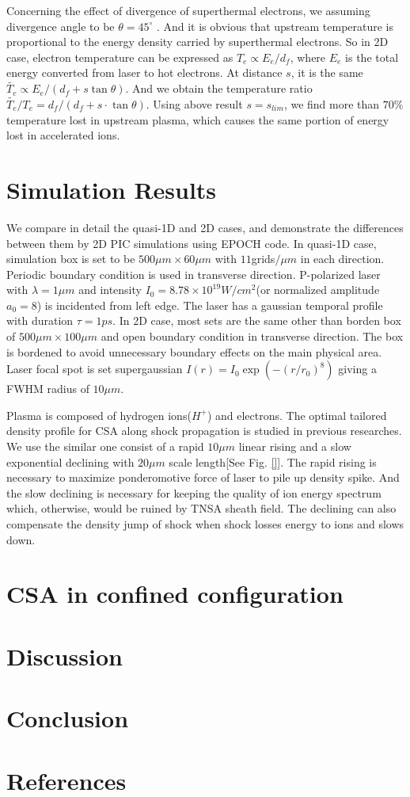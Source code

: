 \documentclass[12pt]{iopart}
\begin{document}
Concerning the effect of divergence of superthermal electrons, we assuming divergence angle to be $\theta=45^\circ$  \cite{gibbon_short_2005}. And it is obvious that upstream temperature is proportional to the energy density carried by superthermal electrons. So in 2D case, electron temperature can be expressed as $T_e\propto E_e/d_f$, where $E_e$ is the total energy converted from laser to hot electrons. At distance $s$, it is the same $\tilde{T_e} \propto E_e/(d_f+s\tan{\theta})$. And we obtain the temperature ratio $\tilde{T_e}/T_e=d_f/(d_f+s\cdot\tan{\theta})$. Using above result $s=s_{lim}$, we find more than $70\%$ temperature lost in upstream plasma, which causes the same portion of energy lost in accelerated ions.

\section{Simulation Results}
\label{simulation}
We compare in detail the quasi-1D and 2D cases, and demonstrate the differences between them by 2D PIC simulations using EPOCH code\cite{}. In quasi-1D case, simulation box is set to be $500\mu m \times 60\mu m$ with $11$grids$/\mu m$ in each direction. Periodic boundary condition is used in transverse direction. P-polarized laser with $\lambda=1\mu m$ and intensity $I_0=8.78\times 10^{19}W/cm^2$(or normalized amplitude $a_0 = 8$) is incidented from left edge. The laser has a gaussian temporal profile with duration $\tau=1ps$. In 2D case, most sets are the same other than borden box of $500\mu m \times 100\mu m$ and open boundary condition in transverse direction. The box is bordened to avoid unnecessary boundary effects on the main physical area. Laser focal spot is set supergaussian $I(r)=I_0\exp(-(r/r_0)^8)$ giving a FWHM radius of $10\mu m$.

Plasma is composed of hydrogen ions($H^+$) and electrons. The optimal tailored density profile for CSA along shock propagation is studied in previous researches\cite{fiuza_ion_2013,fiuza_laser-driven_2012,boella_numerical_2017}. We use the similar one consist of a rapid $10\mu m$ linear rising and a slow exponential declining with $20\mu m$ scale length[See Fig. \ref{}]. The rapid rising is necessary to maximize ponderomotive force of laser to pile up density spike. And the slow declining is necessary for keeping the quality of ion energy spectrum which, otherwise, would be ruined by TNSA sheath field. The declining can also compensate the density jump  of shock when shock losses energy to ions and slows down\cite{macchi_solitary_2012}. 

\section{CSA in confined configuration}
\label{confined}
 
\section{Discussion}
\label{discussion}


\section{Conclusion}
\label{conclusion}
 
\ack


\section*{References}


\end{document}
